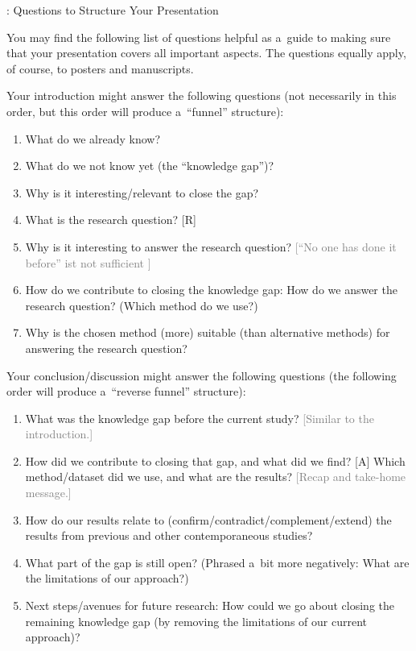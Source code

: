 \begin{frame}[allowframebreaks]{\titleprefix: Questions to Structure Your Presentation}

You may find the following list of questions helpful as a~guide to making sure that your presentation covers all important aspects. The questions equally apply, of course, to posters and manuscripts.

\framebreak

\bgroup
{}
Your introduction might answer the following questions (not necessarily in this order, but this order will produce a~``funnel'' structure):
\begin{enumerate}
	\item What do we already know?
	\item What do we not know yet (the ``knowledge gap'')?
	\item Why is it interesting\slash relevant to close the gap?
	\item \alert{What is the research question? [R]}
	\item Why is it interesting to answer the research question? \textcolor{gray}{[``No one has done it before'' ist not sufficient \textellipsis]}
	\item How do we contribute to closing the knowledge gap: How do we answer the research question? (Which method do we use?)
	\item Why is the chosen method (more) suitable (than alternative methods) for answering the research question?
\end{enumerate}

\framebreak

Your conclusion/discussion might answer the following questions (the following order will produce a~``reverse funnel'' structure):
\begin{enumerate}
	\item[8.] What was the knowledge gap before the current study? \textcolor{gray}{[Similar to the introduction.]}
	\item[9.] \alert{How did we contribute to closing that gap, and what did we find? [A]} Which method\slash dataset did we use, and what are the results? \textcolor{gray}{[Recap and take-home message.]}
	\item[10.] How do our results relate to (confirm\slash contradict\slash complement\slash extend) the results from previous and other contemporaneous studies?
	\item[11.] What part of the gap is still open? (Phrased a~bit more negatively: What are the limitations of our approach?)
	\item[12.] Next steps\slash avenues for future research: How could we go about closing the remaining knowledge gap (by removing the limitations of our current approach)?
\end{enumerate}
\egroup


\end{frame}
